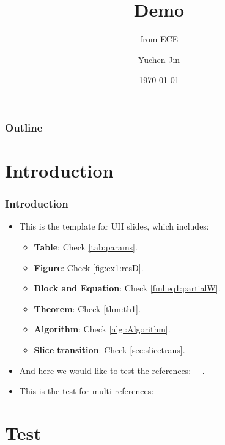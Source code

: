 \documentclass[xcolor={usenames,dvipsnames},aspectratio=169]{beamer}
\title{Demo}
\author{Yuchen Jin}
\subtitle{from ECE}
\institute{}
\date[\MONTH~\the\day] %
{\today}
\begin{document}
\titleframe

\begin{frame}
    \frametitle{Outline}
    \tableofcontents[currentsection]
\end{frame}

\section{Introduction}
\begin{frame}
\frametitle{Introduction}
  \begin{itemize}
    \item This is the template for UH slides, which includes:
    \begin{itemize}
      \item \textbf{Table}: Check \cref{tab:params}.
      \item \textbf{Figure}: Check \cref{fig:ex1:resD}.
      \item \textbf{Block and Equation}: Check \eqref{fml:eq1:partialW}.
      \item \textbf{Theorem}: Check \cref{thm:th1}.
      \item \textbf{Algorithm}: Check \cref{alg::Algorithm}.
      \item \textbf{Slice transition}: Check \cref{sec:slicetrans}.
    \end{itemize}
    \item And here we would like to test the references: \cite{Zeiler5539957}~\cite{Yang6175956}~\cite{Dong7115171}.
    \item This is the test for multi-references: \cite{Zeiler5539957, Yang6175956, Dong7115171}
  \end{itemize}
\end{frame}

\section{Test}
\end{document}
